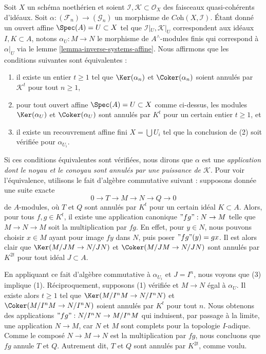 \begin{remark}
\label{remark-inverse-systems-kernel-cokernel-annihilated-by}
Soit $X$ un schéma noethérien et soient
$\mathcal{I}, \mathcal{K} \subset \mathcal{O}_X$
des faisceaux quasi-cohérents d'idéaux. Soit
$\alpha : (\mathcal{F}_n) \to (\mathcal{G}_n)$ un morphisme de
$\textit{Coh}(X, \mathcal{I})$.
Étant donné un ouvert affine $\Spec(A) = U \subset X$ tel que
$\mathcal{I}|_U, \mathcal{K}|_U$ correspondent aux idéaux $I, K \subset A$,
notons $\alpha_U : M \to N$ le morphisme de $A^\wedge$-modules finis
qui correspond à $\alpha|_U$ via le lemme \ref{lemma-inverse-systems-affine}.
Nous affirmons que les conditions suivantes sont équivalentes :
\begin{enumerate}
\item il existe un entier $t \geq 1$ tel que
$\Ker(\alpha_n)$ et $\Coker(\alpha_n)$
soient annulés par $\mathcal{K}^t$ pour tout $n \geq 1$,
\item pour tout ouvert affine $\Spec(A) = U \subset X$ comme ci-dessus,
les modules $\Ker(\alpha_U)$ et $\Coker(\alpha_U)$
sont annulés par $K^t$ pour un certain entier $t \geq 1$, et
\item il existe un recouvrement affine fini $X = \bigcup U_i$
tel que la conclusion de (2) soit vérifiée pour $\alpha_{U_i}$.
\end{enumerate}
Si ces conditions équivalentes sont vérifiées, nous dirons que
$\alpha$ est une
{\it application dont le noyau et le conoyau sont annulés par une puissance de
$\mathcal{K}$}.
Pour voir l'équivalence, utilisons le fait d'algèbre commutative suivant :
supposons donnée une suite exacte
$$
0 \to T \to M \to N \to Q \to 0
$$
de $A$-modules, où $T$ et $Q$ sont annulés par $K^t$ pour un certain
idéal $K \subset A$. Alors, pour tous $f, g \in K^t$, il existe une
application canonique $"fg": N \to M$ telle que $M \to N \to M$ soit la
multiplication par $fg$. En effet, pour $y \in N$, nous pouvons choisir $x \in M$
ayant pour image $fy$ dans $N$, puis poser $"fg"(y) = gx$. Il est alors
clair que $\Ker(M/JM \to N/JN)$ et $\Coker(M/JM \to N/JN)$
sont annulés par $K^{2t}$ pour tout idéal $J \subset A$.

\medskip\noindent
En appliquant ce fait d'algèbre commutative à $\alpha_{U_i}$ et $J = I^n$,
nous voyons que (3) implique (1). Réciproquement,
supposons (1) vérifiée et $M \to N$ égal à $\alpha_U$. Il existe
alors $t \geq 1$ tel que
$\Ker(M/I^nM \to N/I^nN)$ et $\Coker(M/I^nM \to N/I^nN)$
soient annulés par $K^t$ pour tout $n$. Nous obtenons des applications
$"fg" : N/I^nN \to M/I^nM$ qui induisent, par passage à la limite, une application $N \to M$,
car $N$ et $M$ sont complets pour la topologie $I$-adique. Comme le composé
$N \to M \to N$ est la multiplication par $fg$, nous concluons que $fg$
annule $T$ et $Q$. Autrement dit, $T$ et $Q$ sont annulés par
$K^{2t}$, comme voulu.
\end{remark}

